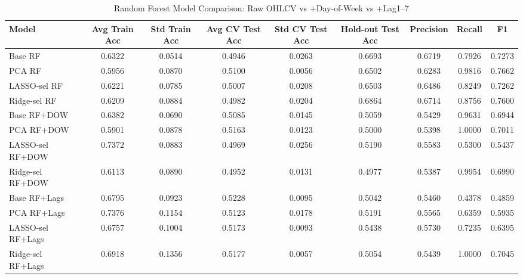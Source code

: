 \begin{table}[htbp]
\centering
\caption{Random Forest Model Comparison: Raw OHLCV vs +Day-of-Week vs +Lag1--7}
\label{tab:base\_rf\_comparison}
\begin{tabular}{lcccccccc}
\hline
Model & Avg Train Acc & Std Train Acc & Avg CV Test Acc & Std CV Test Acc & Hold-out Test Acc & Precision & Recall & F1 \\
\hline
Base RF & 0.6322 & 0.0514 & 0.4946 & 0.0263 & 0.6693 & 0.6719 & 0.7926 & 0.7273 \\
PCA RF & 0.5956 & 0.0870 & 0.5100 & 0.0056 & 0.6502 & 0.6283 & 0.9816 & 0.7662 \\
LASSO-sel RF & 0.6221 & 0.0785 & 0.5007 & 0.0208 & 0.6503 & 0.6486 & 0.8249 & 0.7262 \\
Ridge-sel RF & 0.6209 & 0.0884 & 0.4982 & 0.0204 & 0.6864 & 0.6714 & 0.8756 & 0.7600 \\
Base RF+DOW & 0.6382 & 0.0690 & 0.5085 & 0.0145 & 0.5059 & 0.5429 & 0.9631 & 0.6944 \\
PCA RF+DOW & 0.5901 & 0.0878 & 0.5163 & 0.0123 & 0.5000 & 0.5398 & 1.0000 & 0.7011 \\
LASSO-sel RF+DOW & 0.7372 & 0.0883 & 0.4969 & 0.0256 & 0.5190 & 0.5583 & 0.5300 & 0.5437 \\
Ridge-sel RF+DOW & 0.6113 & 0.0890 & 0.4952 & 0.0131 & 0.4977 & 0.5387 & 0.9954 & 0.6990 \\
Base RF+Lags & 0.6795 & 0.0923 & 0.5228 & 0.0095 & 0.5042 & 0.5460 & 0.4378 & 0.4859 \\
PCA RF+Lags & 0.7376 & 0.1154 & 0.5123 & 0.0178 & 0.5191 & 0.5565 & 0.6359 & 0.5935 \\
LASSO-sel RF+Lags & 0.6757 & 0.1004 & 0.5173 & 0.0093 & 0.5438 & 0.5730 & 0.7235 & 0.6395 \\
Ridge-sel RF+Lags & 0.6918 & 0.1356 & 0.5177 & 0.0057 & 0.5054 & 0.5439 & 1.0000 & 0.7045 \\
\hline
\end{tabular}
\end{table}
